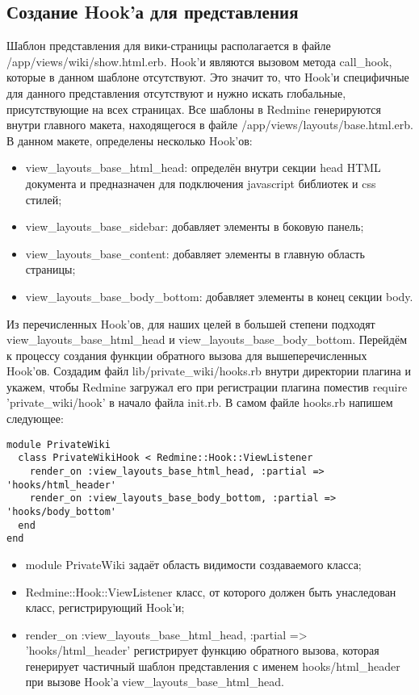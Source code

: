 \subsection{Создание Hook'а для представления}
Шаблон представления для вики-страницы располагается в файле
/app/views/wiki/show.html.erb. Hook'и являются вызовом метода call\_hook,
которые в данном шаблоне отсутствуют. Это значит то, что Hook'и специфичные для
данного представления отсутствуют и нужно искать глобальные, присутствующие на
всех страницах. Все шаблоны в Redmine генерируются внутри главного макета,
находящегося в файле /app/views/layouts/base.html.erb. В данном макете,
определены несколько Hook'ов:
\begin{itemize}
  \item view\_layouts\_base\_html\_head: определён внутри секции head HTML
  документа и предназначен для подключения javascript библиотек и css стилей;
  \item view\_layouts\_base\_sidebar: добавляет элементы в
  боковую панель;
  \item view\_layouts\_base\_content: добавляет элементы в главную область
  страницы;
  \item view\_layouts\_base\_body\_bottom: добавляет элементы в конец секции
  body.
\end{itemize}
Из перечисленных Hook'ов, для наших целей в большей степени подходят
view\_layouts\_base\_html\_head и view\_layouts\_base\_body\_bottom.
Перейдём к процессу создания функции обратного вызова для вышеперечисленных
Hook'ов. Создадим файл lib/private\_wiki/hooks.rb внутри директории плагина и
укажем, чтобы Redmine загружал его при регистрации плагина поместив require
'private\_wiki/hook' в начало файла init.rb. В самом файле hooks.rb напишем
следующее:
\small{
\begin{lstlisting}
module PrivateWiki
  class PrivateWikiHook < Redmine::Hook::ViewListener
    render_on :view_layouts_base_html_head, :partial => 'hooks/html_header'
    render_on :view_layouts_base_body_bottom, :partial => 'hooks/body_bottom'
  end
end
\end{lstlisting}
}
\begin{itemize}
  \item module PrivateWiki задаёт область видимости создаваемого класса;
  \item Redmine::Hook::ViewListener класс, от которого должен быть унаследован
  класс, регистрирующий Hook'и;
  \item render\_on :view\_layouts\_base\_html\_head, :partial => 'hooks/html\_header'
 регистрирует функцию обратного вызова, которая генерирует частичный шаблон представления с
именем hooks/html\_header при вызове Hook'а view\_layouts\_base\_html\_head.
\end{itemize}
